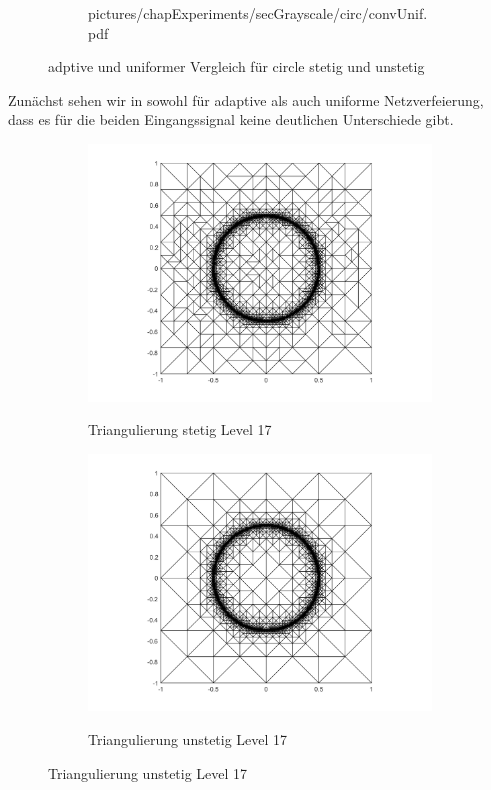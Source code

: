 \begin{figure}[p]
\begin{subfigure}[b]{.48\linewidth}
      {pictures/chapExperiments/secGrayscale/circ/convUnif.pdf}
    \label{fig:circConvUniform}
  \end{subfigure}
  \caption{adptive und uniformer Vergleich für circle stetig und unstetig}
  \label{fig:circConvComparison}
\end{figure}
Zunächst sehen wir in  sowohl für adaptive
als auch uniforme Netzverfeierung, dass es für die beiden Eingangssignal 
keine deutlichen Unterschiede gibt. 
\begin{figure}[p]
  \centering
  \begin{subfigure}[b]{.48\linewidth}
    \centering
    \caption{Triangulierung stetig Level 17}
    \includegraphics[trim = 100 30 80 20, clip, width=\linewidth]
      {pictures/chapExperiments/secGrayscale/circ/cont/adaptive/lvl17/triangulation.png}
    \label{fig:circContLvl17Triang}
  \end{subfigure}
  \quad
  \begin{subfigure}[b]{.48\linewidth}
    \centering
    \caption{Triangulierung unstetig Level 17}
    \includegraphics[trim = 100 30 80 20, clip, width=\linewidth]
      {pictures/chapExperiments/secGrayscale/circ/disc/adaptive/lvl17/triangulation.png}
    \label{fig:circDiscLvl17Triang}
  \end{subfigure}


\end{figure}
